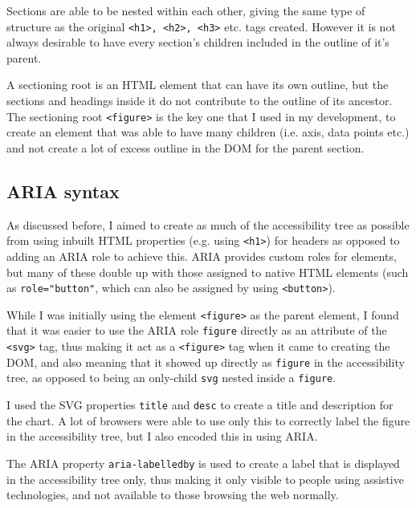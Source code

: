 \documentclass[ %
                    author={Aleena Baig},
                supervisor={Dr Simon Lock},
                    degree={BSc},
                     title={On Making Web Accessible Graphs},
                  subtitle={},
                      year={2019} ]{dissertation}
\begin{document}
Sections are able to be nested within each other, giving the same type of structure as the original \texttt{<h1>, <h2>, <h3>} etc. tags created. However it is not always desirable to have every section's children included in the outline of it's parent.

A sectioning root is an HTML element that can have its own outline, but the sections and headings inside it do not contribute to the outline of its ancestor. The sectioning root \texttt{<figure>} is the key one that I used in my development, to create an element that was able to have many children (i.e. axis, data points etc.) and not create a lot of excess outline in the DOM for the parent section.


\subsection{ARIA syntax}

As discussed before, I aimed to create as much of the accessibility tree as possible from using inbuilt HTML properties (e.g. using \texttt{<h1>}) for headers as opposed to adding an ARIA role to achieve this. ARIA provides custom roles for elements, but many of these double up with those assigned to native HTML elements (such as \texttt{role="button"}, which can also be assigned by using \texttt{<button>}).


While I was initially using the element \texttt{<figure>} as the parent element, I found that it was easier to use the ARIA role \texttt{figure} directly as an attribute of the \texttt{<svg>} tag, thus making it act as a \texttt{<figure>} tag when it came to creating the DOM, and also meaning that it showed up directly as \texttt{figure} in the accessibility tree, as opposed to being an only-child \texttt{svg} nested inside a \texttt{figure}.

I used the SVG properties \texttt{title} and \texttt{desc} to create a title and description for the chart. A lot of browsers were able to use only this to correctly label the figure in the accessibility tree, but I also encoded this in using ARIA.

The ARIA property \texttt{aria-labelledby} is used to create a label that is displayed in the accessibility tree only, thus making it only visible to people using assistive technologies, and not available to those browsing the web normally.
\end{document}
